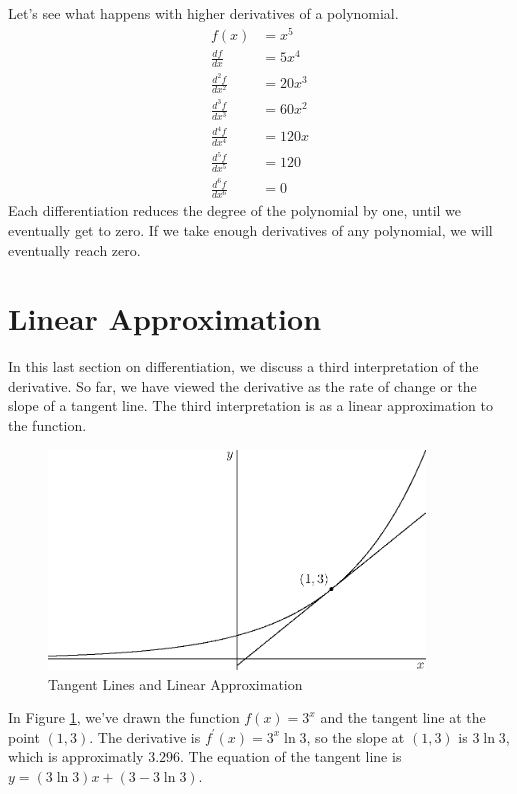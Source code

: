 \documentclass[fleqn]{report}
\begin{document}
\begin{example}
Let's see what happens with higher derivatives of a
polynomial. 
\begin{align*}
f(x) & = x^5 \\
\frac{df}{dx} & = 5x^4 \\
\frac{d^2f}{dx^2} & = 20x^3 \\
\frac{d^3f}{dx^3} & = 60x^2 \\
\frac{d^4f}{dx^4} & = 120x \\
\frac{d^5f}{dx^5} & = 120 \\
\frac{d^6f}{dx^6} & = 0 
\end{align*}
Each differentiation reduces the degree of the polynomial by
one, until we eventually get to zero. If we take enough
derivatives of any polynomial, we will eventually reach zero.
\end{example}

\section{Linear Approximation}
\label{linear-approximation}

In this last section on differentiation, we discuss a third
interpretation of the derivative. So far, we have viewed the 
derivative as the rate of change or the slope of a tangent line.
The third interpretation is as a linear approximation to the
function. 

\begin{figure}[t]
\centering
\includegraphics[width=10cm]{figure51.eps}
\caption{Tangent Lines and Linear Approximation}
\label{figure-linear-approximation}
\end{figure}

In Figure \ref{figure-linear-approximation}, we've
drawn the function $f(x) = 3^x$ and the tangent line at the
point $(1,3)$. The derivative is $f^\prime(x) = 3^x \ln 3$, so
the slope at $(1,3)$ is $3 \ln 3$, which is approximatly
$3.296$. The equation of the tangent line is $y = (3 \ln 3) x
+ (3 - 3 \ln 3)$. 
\end{document}
